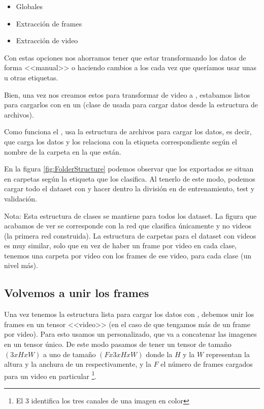 \begin{itemize}
  \item Globales
  \item Extracción de frames
  \item Extracción de video
\end{itemize}

Con estas opciones nos ahorramos tener que estar transformando los datos de forma <<manual>> o haciendo cambios a los  cada vez que queríamos usar unas u otras etiquetas.

Bien, una vez nos creamos estos  para transformar de video a , estabamos listos para cargarlos con  en un  (clase de  usada para cargar datos desde la estructura de archivos).

Como funciona el , usa la estructura de archivos para cargar los datos, es decir, que carga los datos y los relaciona con la etiqueta correspondiente según el nombre de la carpeta en la que están.


En la figura \ref{fig:FolderStructure} podemos observar que los  exportados se situan en carpetas según la etiqueta que los clasifica. Al tenerlo de este modo, podemos cargar todo el dataset con  y hacer dentro la división en  de entrenamiento, test y validación.

Nota: Esta estructura de clases se mantiene para todos los dataset. La figura que acabamos de ver se corresponde con la red que clasifica únicamente  y no videos (la primera red construida). La estructura de carpetas para el dataset con videos es muy similar, solo que en vez de haber un frame por video en cada clase, tenemos una carpeta por video con los frames de ese video, para cada clase (un nivel más).

\subsection{Volvemos a unir los frames}

Una vez tenemos la estructura lista para cargar los datos con , debemos unir los frames en un tensor <<video>> (en el caso de que tengamos más de un frame por video). Para esto usamos un  personalizado, que va a concatenar las imagenes en un tensor único. De este modo pasamos de tener un tensor de tamaño $(3xHxW)$ a uno de tamaño $(Fx3xHxW)$ donde la $H$ y la $W$ representan la altura y la anchura de un  respectivamente, y la $F$ el número de frames cargados para un video en particular \footnote{El 3 identifica los tres canales  de una imagen en color}.

